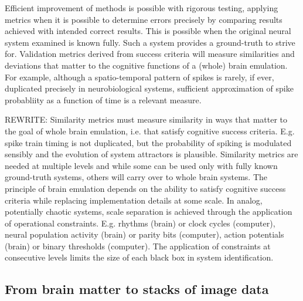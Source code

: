 \documentclass{ldr-article}
\begin{document}
Efficient improvement of methods is possible with rigorous testing, applying metrics when it is possible to determine errors precisely by comparing results achieved with intended correct results. This is possible when the original neural system examined is known fully. Such a system provides a ground-truth to strive for. Validation metrics derived from success criteria will measure similarities and deviations that matter to the cognitive functions of a (whole) brain emulation. For example, although a spatio-temporal pattern of spikes is rarely, if ever, duplicated precisely in neurobiological systems, sufficient approximation of spike probabliity as a function of time is a relevant measure.

\alert{REWRITE}:
Similarity metrics must measure similarity in ways that matter to the goal of whole brain emulation, i.e. that satisfy cognitive success criteria. E.g. spike train timing is not duplicated, but the probability of spiking is modulated sensibly and the evolution of system attractors is plausible. Similarity metrics are needed at multiple levels and while some can be used only with fully known ground-truth systems, others will carry over to whole brain systems. The principle of brain emulation depends on the ability to satisfy cognitive success criteria while replacing implementation details at some scale. In analog, potentially chaotic systems, scale separation is achieved through the application of operational constraints. E.g. rhythms (brain) or clock cycles (computer), neural population activity (brain) or parity bits (computer), action potentials (brain) or binary thresholds (computer). The application of constraints at consecutive levels limits the size of each black box in system identification.


\subsection{From brain matter to stacks of image data}

\end{document}
